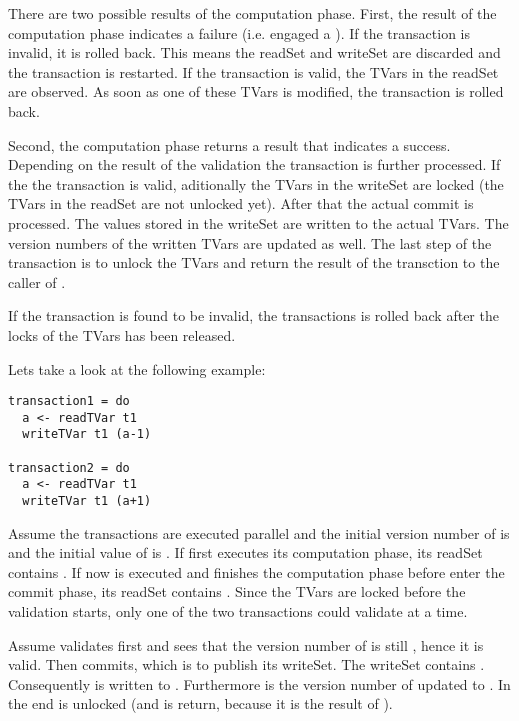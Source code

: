 There are two possible results of the computation phase. First, the result of the computation phase indicates a 
failure (i.e. engaged a ). If the transaction is invalid, 
it is rolled back. This means the readSet and writeSet are discarded and the transaction is restarted. If the transaction is
valid, the TVars in the readSet are observed. As soon as one of these TVars is modified, the transaction is rolled back.

Second, the computation phase returns a result that indicates a success.
Depending on the result of the validation the transaction is further processed. If the the transaction is valid, aditionally the
TVars in the writeSet are locked (the TVars in the readSet are not unlocked yet). After that the actual commit is processed. 
The values stored in the writeSet are written to the actual TVars. The version numbers of the written TVars are updated as well.
The last step of the transaction is to unlock the TVars and return the result of the transction to the caller of .

If the transaction is found to be invalid, the transactions is rolled back after the locks of the TVars has been released.


Lets take a look at the following example:
\begin{lstlisting}
transaction1 = do 
  a <- readTVar t1
  writeTVar t1 (a-1)
  
transaction2 = do 
  a <- readTVar t1
  writeTVar t1 (a+1)
\end{lstlisting}
Assume the transactions are executed parallel and the initial version number of  is  and the initial value of  is .
If  first executes its computation phase, its readSet contains . 
If now  is executed and finishes the computation phase before  enter the commit phase,
its readSet contains . Since the TVars are locked before the validation starts, only one
of the two transactions could validate at a time. 

Assume  validates first and sees that the version number of 
is still , hence it is valid. Then  commits, which is to publish its writeSet.
The writeSet contains .  Consequently  is written to . Furthermore is the version number of  updated
to . In the end  is unlocked (and \code{()} is return, because it is the result of ).


